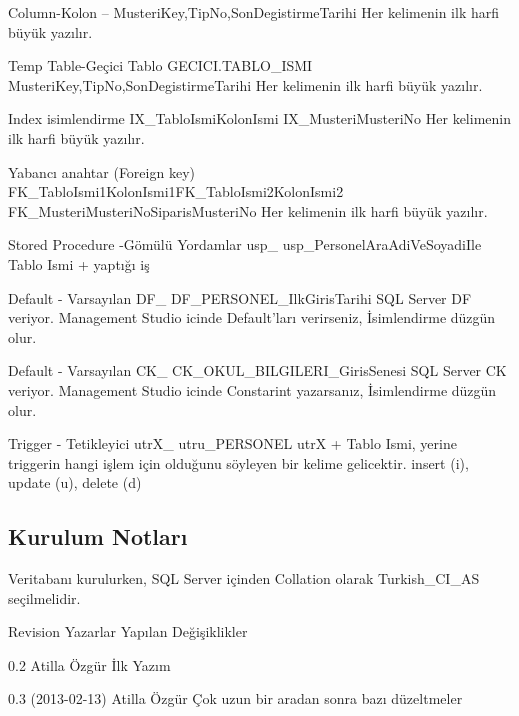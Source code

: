 \documentclass[10pt,a4paper]{article}
\begin{document}
     Column-Kolon 
     -- 
    MusteriKey,TipNo,SonDegistirmeTarihi 
    Her kelimenin ilk harfi büyük yazılır. 
  
     Temp Table-Geçici Tablo 
     GECICI.TABLO\_ISMI 
    MusteriKey,TipNo,SonDegistirmeTarihi 
    Her kelimenin ilk harfi büyük yazılır. 
  
     Index isimlendirme 
     IX\_TabloIsmiKolonIsmi 
     IX\_MusteriMusteriNo 
    Her kelimenin ilk harfi büyük yazılır. 
  
     Yabancı anahtar (Foreign key) 
     FK\_TabloIsmi1KolonIsmi1FK\_TabloIsmi2KolonIsmi2 
     FK\_MusteriMusteriNoSiparisMusteriNo 
    Her kelimenin ilk harfi büyük yazılır. 
  
     Stored Procedure -Gömülü Yordamlar 
     usp\_ 
     usp\_PersonelAraAdiVeSoyadiIle 
     Tablo Ismi + yaptığı iş 		  
  
    Default - Varsayılan 
     DF\_ 
     DF\_PERSONEL\_IlkGirisTarihi 
     SQL Server DF veriyor. Management Studio icinde Default'ları 
      verirseniz, İsimlendirme düzgün olur. 		  
  
     Default - Varsayılan 
     CK\_ 
     CK\_OKUL\_BILGILERI\_GirisSenesi 
     SQL Server CK veriyor. Management Studio icinde Constarint 
      yazarsanız, İsimlendirme düzgün olur. 				 
  
     Trigger - Tetikleyici 
     utrX\_ 
     utru\_PERSONEL 
      utrX + Tablo Ismi, yerine triggerin hangi işlem için olduğunu 
      söyleyen bir kelime gelicektir. insert (i), update (u), delete (d)
  
\subsection{Kurulum Notları}
Veritabanı kurulurken, SQL Server içinden Collation olarak Turkish\_CI\_AS 
seçilmelidir. 
  
      
      
Revision 
Yazarlar 
Yapılan Değişiklikler 
  
     0.2  
     Atilla Özgür 
    İlk Yazım 
    
  
     0.3 (2013-02-13) 
     Atilla Özgür 
    Çok uzun bir aradan sonra bazı düzeltmeler 
    
    
\end{document}
